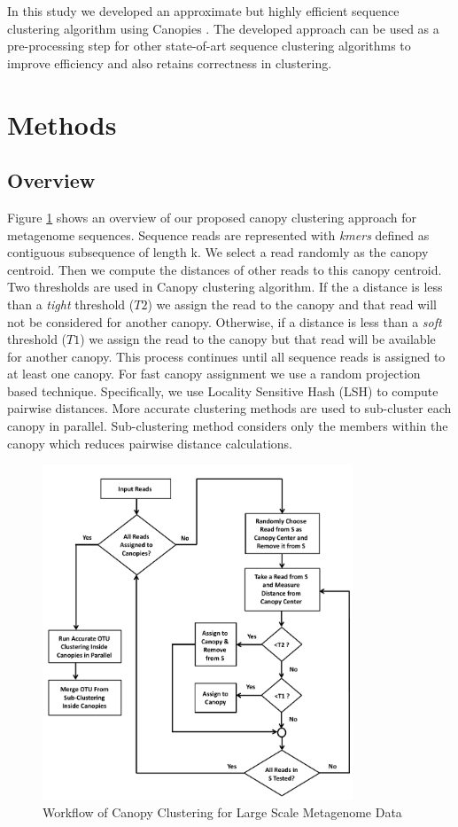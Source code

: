\documentclass[10pt, conference, compsocconf]{IEEEtran}
\begin{document}
In this study we developed an approximate but highly efficient sequence clustering algorithm  using Canopies \cite{MARCanopy}. The developed approach can be used as a pre-processing step for other state-of-art sequence clustering algorithms to improve efficiency and also retains correctness in clustering.

\section{Methods}
\label{sec:Methods}
\subsection{\textbf{Overview}}

Figure \ref{fig:flowchart} shows an overview of our proposed canopy clustering approach for metagenome sequences. Sequence reads are represented with \textit{kmers} defined as contiguous subsequence of length k. We select a read randomly as the canopy centroid. Then we compute the distances of other reads to this canopy centroid. Two thresholds are used in Canopy clustering algorithm. If the a distance is less than a \emph{tight} threshold ($T2$) we assign the read to the canopy and that read will not be considered for another canopy. Otherwise, if a distance is less than a \emph{soft} threshold ($T1$) we assign the read to the canopy but that read will be available for another canopy. This process continues until all sequence reads is assigned to at least one canopy. For fast canopy assignment we use a random projection based technique. Specifically, we use Locality Sensitive Hash (LSH) to compute pairwise distances. More accurate clustering methods are used to sub-cluster each canopy in parallel. Sub-clustering method considers only the members within the canopy which reduces pairwise distance calculations.

\begin{figure}
	\centering
	\includegraphics[width=\linewidth,height=10cm]{flowchart.pdf}	
	\caption{Workflow of Canopy Clustering for Large Scale Metagenome Data}
	\label{fig:flowchart}
\end{figure}
\end{document}
